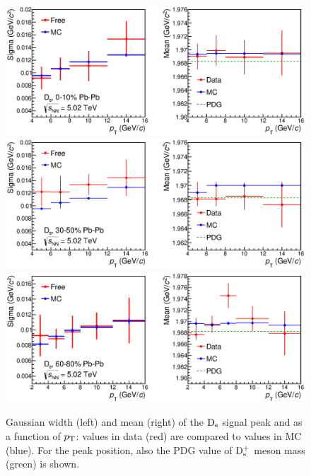 \begin{figure}[!ht]
 \begin{center}
  \includegraphics[width=15cm]{./FigCap5/DsMeanSigma_DataMC_010.eps}
  \includegraphics[width=15cm]{./FigCap5/DsMeanSigma_DataMC_3050.eps}
  \includegraphics[width=15cm]{./FigCap5/DsMeanSigma_DataMC_6080.eps}
 \end{center}
 \caption{Gaussian width (left) and mean (right) of the ${\rm D_s}$ signal peak and as a function of $p_{\rm T}$: values in data (red) are compared to values in MC (blue). For the peak position, also the PDG value of ${\rm D_s^+}$ meson mass (green) is shown. }
 \label{fig:MCsigmacheckDs} 
\end{figure} 


